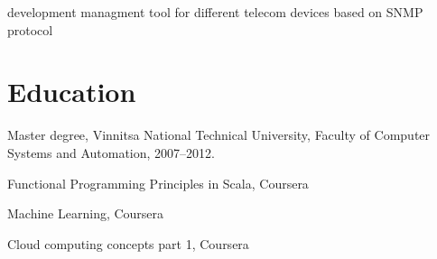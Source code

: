 \documentclass[letterpaper]{article}
\renewenvironment{itemize}{
  \begin{list}{}{
    \setlength{\leftmargin}{1.5em}
  }
}{
  \end{list}
}
\begin{document}
\begin{itemize}
\item development managment tool for different telecom devices based on SNMP protocol
\end{itemize}

\section*{Education}

\begin{itemize}
  \item Master degree, Vinnitsa National Technical University, Faculty of Computer 
Systems and Automation, 2007--2012.
  \item Functional Programming Principles in Scala, Coursera
  \item Machine Learning, Coursera
  \item Cloud computing concepts part 1, Coursera
\end{itemize}
\end{document}
